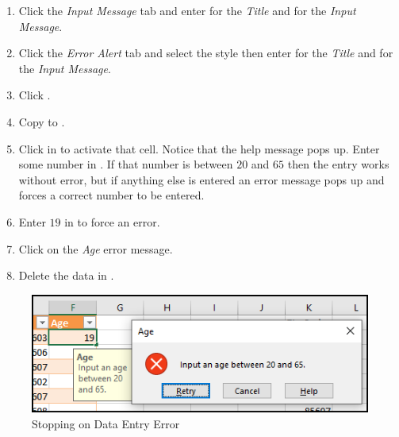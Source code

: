 \begin{enumerate}[resume]	
	\item Click the \textit{Input Message} tab and enter  for the \textit{Title} and  for the \textit{Input Message}.
	\item Click the \textit{Error Alert} tab and select the  style then enter  for the \textit{Title} and  for the \textit{Input Message}.
	\item Click .
	\item Copy  to .
	\item Click in  to activate that cell. Notice that the help message pops up. Enter some number in . If that number is between $ 20 $ and $ 65 $ then the entry works without error, but if anything else is entered an error message pops up and forces a correct number to be entered.
	\item Enter $ 19 $ in  to force an error.
	\item Click  on the \textit{Age} error message.
	\item Delete the data in .
\end{enumerate}

\begin{figure}[H]
	\centering
	\includegraphics[width=\maxwidth{.75\linewidth}]{gfx/ch07_fig40}
	\caption{Stopping on Data Entry Error}
	\label{07:fig40}
\end{figure}

